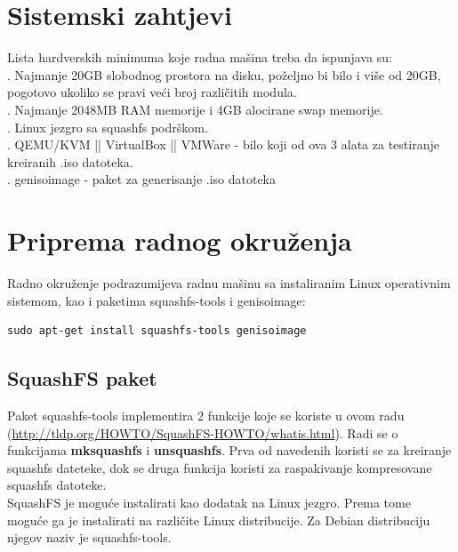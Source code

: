 \documentclass[12pt,vi]{mitthesis}
\begin{document}
\chapter*{Sistemski zahtjevi}
Lista hardverskih minimuma koje radna mašina treba da ispunjava su:\\
. Najmanje 20GB slobodnog prostora na disku, poželjno bi bilo i više od 20GB, pogotovo ukoliko se pravi veći broj različitih modula.\\
. Najmanje 2048MB RAM memorije i 4GB alocirane swap memorije.\\
. Linux jezgro sa squashfs podrškom.\\
. QEMU/KVM || VirtualBox || VMWare - bilo koji od ova 3 alata za testiranje kreiranih .iso datoteka.\\
. genisoimage - paket za generisanje .iso datoteka\\

\chapter*{Priprema radnog okruženja}
\indent
Radno okruženje podrazumijeva radnu mašinu sa instaliranim Linux operativnim sistemom, kao i paketima squashfs-tools i genisoimage:
\begin{lstlisting}[style=BashInputStyle]
sudo apt-get install squashfs-tools genisoimage
\end{lstlisting}

\section*{SquashFS paket}
Paket squashfs-tools implementira 2 funkcije koje se koriste u ovom radu (\url{http://tldp.org/HOWTO/SquashFS-HOWTO/whatis.html}).
Radi se o funkcijama \textbf{mksquashfs} i \textbf{unsquashfs}. Prva od navedenih koristi se za kreiranje squashfs dateteke, dok se druga funkcija koristi za raspakivanje kompresovane squashfs datoteke.\\
SquashFS je moguće instalirati kao dodatak na Linux jezgro. Prema tome moguće ga je instalirati na različite Linux distribucije. Za Debian distribuciju njegov naziv je squashfs-tools.
\end{document}
